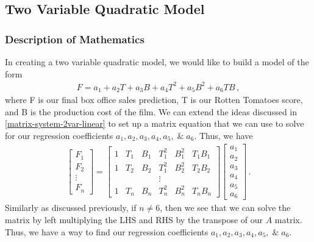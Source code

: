 \documentclass[11pt]{article}
\begin{document}
\subsection{Two Variable Quadratic Model}
\subsubsection{Description of Mathematics}
\label{matrix-system-2var-quadratic}
In creating a two variable quadratic model, we would like to build a model of the form
\begin{align*}
    F = a_1 + a_2 T + a_3 B + a_4 T^2 + a_5 B^2 + a_6 TB \, ,
\end{align*}
where F is our final box office sales prediction, T is our Rotten Tomatoes score, and B is the production cost of the film.
We can extend the ideas discussed in \ref{matrix-system-2var-linear} to set up a matrix equation that we can use to solve for our regression coefficients $a_1, a_2, a_3, a_4, a_5, \; \& \; a_6$.  
Thus, we have
\begin{align*}
    \begin{bmatrix}
        F_1\\
        F_2 \\
        \vdots \\
        F_n
    \end{bmatrix}
    =
    \begin{bmatrix}
        1 & T_1 & B_1 & T_1^2 & B_1^2 & T_1 B_1\\
        1 & T_2 & B_2 & T_1^2 & B_2^2 & T_2 B_2\\
        & & & \vdots & \\
        1 & T_n & B_n & T_n^2 & B_n^2 & T_n B_n
    \end{bmatrix} 
    \begin{bmatrix}
        a_1 \\
        a_2 \\
        a_3 \\
        a_4 \\
        a_5 \\
        a_6
    \end{bmatrix} \, .
\end{align*}
Similarly as discussed previously, if $n \neq 6$, then we see that we can solve the matrix by left multiplying the LHS and RHS by the transpose of our $A$ matrix.  
Thus, we have a way to find our regression coefficients $a_1, a_2, a_3, a_4, a_5, \; \& \; a_6$.
\end{document}
